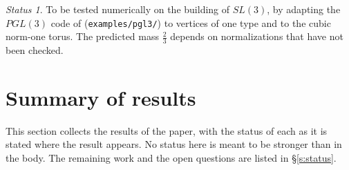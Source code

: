 \documentclass[12pt,letterpaper]{article}
\numberwithin{equation}{section}
\theoremstyle{plain}
\theoremstyle{definition}
\theoremstyle{remark}
\newtheorem{status}[theorem]{Status}
\begin{document}
\begin{status}
To be tested numerically on the building of $SL(3)$, by adapting the $PGL(3)$ code of \cite[App.~A]{JC26} (\texttt{examples/pgl3/}) to vertices of one type and to the cubic norm-one torus. The predicted mass $\frac23$ depends on normalizations that have not been checked.
\end{status}

\section{Summary of results}\label{s:summary}

This section collects the results of the paper, with the status of each as it is stated where the result appears. No status here is meant to be stronger than in the body. The remaining work and the open questions are listed in \S\ref{s:status}.
\end{document}
